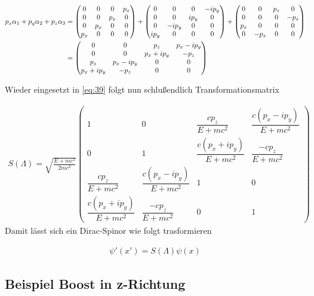 \begin{align}
  \label{eq:41}
  p_x\alpha_1+p_y\alpha_2+p_z\alpha_3 &=
  \begin{pmatrix}
     0&0&0&p_x\\
   0&0&p_x&0\\
 0&p_x&0&0\\
 p_x&0&0&0
  \end{pmatrix}+ \begin{pmatrix}
   0&0&0&-ip_y\\
   0&0&ip_y&0\\
 0&-ip_y&0&0\\
 ip_y&0&0&0
  \end{pmatrix}+
 \begin{pmatrix}
   0&0&p_z&0\\
   0&0&0&-p_z\\
 p_z&0&0&0\\
 0&-p_z&0&0
  \end{pmatrix}\notag\\
&=  \begin{pmatrix}
     0&0&p_z&p_x-ip_y\\
   0&0&p_x+ip_y&-p_z\\
 p_z&p_x-ip_y&0&0\\
 p_x+ip_y&-p_z&0&0
  \end{pmatrix}
\end{align}

Wieder eingesetzt in \eqref{eq:39} folgt nun schlußendlich Transformationsmatrix

\begin{align}
  \label{eq:42}
\boxed{
  S(\Lambda)=\sqrt{\frac{E + mc^2}{2mc^2}}
  \begin{pmatrix}
    1&0&\dfrac{cp_z}{E+mc^2}&\dfrac{c(p_x-ip_y)}{E+mc^2}\\[2ex]
    0&1&\dfrac{c(p_x+ip_y)}{E+mc^2}&\dfrac{-cp_z}{E+mc^2}\\[2ex]
    \dfrac{cp_z}{E+mc^2}&\dfrac{c(p_x-ip_y)}{E+mc^2}&1&0\\[2ex]
    \dfrac{c(p_x+ip_y)}{E+mc^2}&\dfrac{-cp_z}{E+mc^2}&0&1
  \end{pmatrix}
}
\end{align}
Damit lässt sich ein Dirac-Spinor wie folgt trasformieren

\begin{align}
  \label{eq:43}
  \psi'(x') = S(\Lambda)\psi(x)
\end{align}


\subsection*{Beispiel Boost in z-Richtung}

